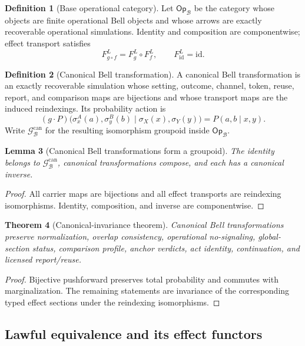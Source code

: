 \documentclass[11pt]{article}
\newtheorem{theorem}{Theorem}[section]
\newtheorem{lemma}[theorem]{Lemma}
\theoremstyle{definition}
\newtheorem{definition}[theorem]{Definition}
\newcommand{\Bell}{\mathcal{B}}
\newcommand{\BellCan}{\mathcal{G}_{\Bell}^{\mathrm{can}}}
\newcommand{\BellBase}{\mathsf{Op}_{\Bell}}
\begin{document}
\begin{definition}[Base operational category]\label{def:baseoperationalcategory}
Let $\BellBase$ be the category whose objects are finite operational Bell objects and whose arrows are exactly recoverable operational simulations. Identity and composition are componentwise; effect transport satisfies
\[
F_{g\circ f}^L=F_g^L\circ F_f^L,
\qquad F_{\mathrm{id}}^L=\mathrm{id}.
\]
\end{definition}

\begin{definition}[Canonical Bell transformation]\label{def:canonicalbelltransformation}
A canonical Bell transformation is an exactly recoverable simulation whose setting, outcome, channel, token, reuse, report, and comparison maps are bijections and whose transport maps are the induced reindexings. Its probability action is
\[
(g\!\cdot\!P)\bigl(\sigma^A_x(a),\sigma^B_y(b)\mid\sigma_X(x),\sigma_Y(y)\bigr)=P(a,b\mid x,y).
\]
Write $\BellCan$ for the resulting isomorphism groupoid inside $\BellBase$.
\end{definition}

\begin{lemma}[Canonical Bell transformations form a groupoid]\label{lem:canonicalgroupoid}
The identity belongs to $\BellCan$, canonical transformations compose, and each has a canonical inverse.
\end{lemma}
\begin{proof}
All carrier maps are bijections and all effect transports are reindexing isomorphisms. Identity, composition, and inverse are componentwise.
\end{proof}

\begin{theorem}[Canonical-invariance theorem]\label{thm:canonicalinvariance}
Canonical Bell transformations preserve normalization, overlap consistency, operational no-signaling, global-section status, comparison profile, anchor verdicts, act identity, continuation, and licensed report/reuse.
\end{theorem}
\begin{proof}
Bijective pushforward preserves total probability and commutes with marginalization. The remaining statements are invariance of the corresponding typed effect sections under the reindexing isomorphisms.
\end{proof}

\subsection{Lawful equivalence and its effect functors}
\end{document}
